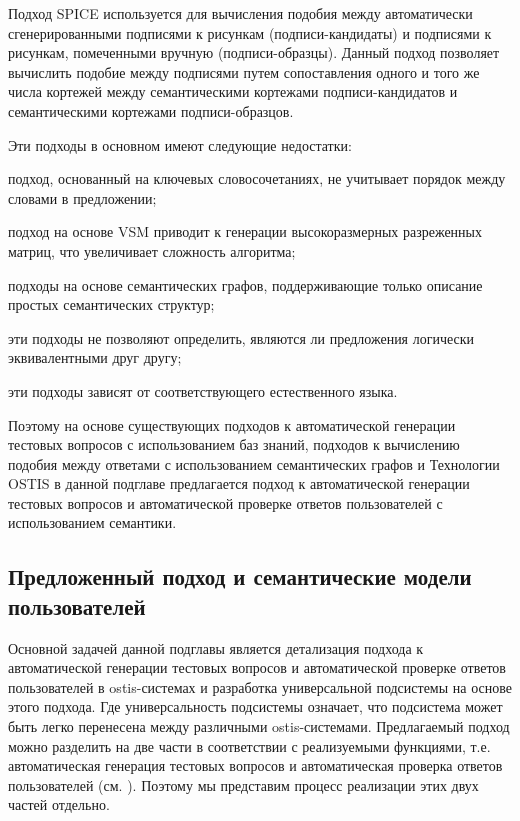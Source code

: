 \begin{textitemize}
	Подход SPICE используется для вычисления подобия между автоматически сгенерированными подписями к рисункам (подписи-кандидаты) и подписями к рисункам, помеченными вручную (подписи-образцы). Данный подход позволяет вычислить подобие между подписями путем сопоставления одного и того же числа кортежей между семантическими кортежами подписи-кандидатов и семантическими кортежами подписи-образцов.
	
\end{textitemize}

Эти подходы в основном имеют следующие недостатки:

\begin{textitemize}
	\item подход, основанный на ключевых словосочетаниях, не учитывает порядок между словами в предложении;
	\item подход на основе VSM приводит к генерации высокоразмерных разреженных матриц, что увеличивает сложность алгоритма;
	\item подходы на основе семантических графов, поддерживающие только описание простых семантических структур;
	\item эти подходы не позволяют определить, являются ли предложения логически эквивалентными друг другу;
	\item эти подходы зависят от соответствующего естественного языка.
\end{textitemize}

Поэтому на основе существующих подходов к автоматической генерации тестовых вопросов с использованием баз знаний, подходов к вычислению подобия между ответами с использованием семантических графов и Технологии OSTIS в данной подглаве предлагается подход к автоматической генерации тестовых вопросов и автоматической проверке ответов пользователей с использованием семантики.

\subsection{Предложенный подход и семантические модели пользователей}

Основной задачей данной подглавы является детализация подхода к автоматической генерации тестовых вопросов и автоматической проверке ответов пользователей в ostis-системах и разработка универсальной подсистемы на основе этого подхода. Где универсальность подсистемы означает, что подсистема может быть легко перенесена между различными ostis-системами. Предлагаемый подход можно разделить на две части в соответствии с реализуемыми функциями, т.е. автоматическая генерация тестовых вопросов и автоматическая проверка ответов пользователей (см. ). Поэтому мы представим процесс реализации этих двух частей отдельно.

